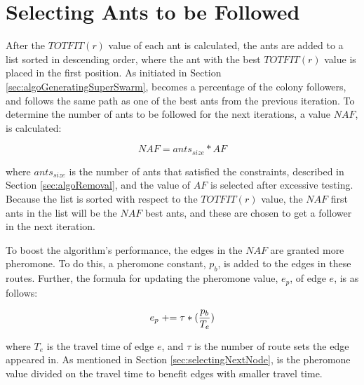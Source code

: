 \section{Selecting Ants to be Followed}
\label{sec:selctingAntsToBeFollowed}

After the $TOTFIT(r)$ value of each ant is calculated, the ants are added to a list sorted in descending order, where the ant with the best $TOTFIT(r)$ value is placed in the first position. As initiated in Section \vref{sec:algoGeneratingSuperSwarm}, becomes a percentage of the colony followers, and follows the same path as one of the best ants from the previous iteration. To determine the number of ants to be followed for the next iterations, a value $NAF$, is calculated:

$$NAF = ants_{size} * AF$$
 
where $ants_{size}$ is the number of ants that satisfied the constraints, described in Section \vref{sec:algoRemoval}, and the value of $AF$ is selected after excessive testing. Because the list is sorted with respect to the $TOTFIT(r)$ value, the $NAF$ first ants in the list will be the $NAF$ best ants, and these are chosen to get a follower in the next iteration. %

To boost the algorithm's performance, the edges in the $NAF$ are granted more pheromone. To do this, a pheromone constant, $p_b$, is added to the edges in these routes. Further, the formula for updating the pheromone value, $e_p$, of edge $e$, is as follows:

$$e_p \mathrel{+}= \tau*(\frac{p_b}{T_e})$$ 

where $T_e$ is the travel time of edge $e$, and $\tau$ is the number of route sets the edge appeared in. As mentioned in Section \vref{sec:selectingNextNode}, is the pheromone value divided on the travel time to benefit edges with smaller travel time.


 